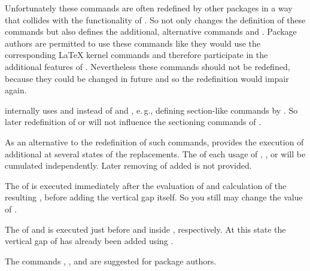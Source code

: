 Unfortunately these commands are often redefined by other packages in a way
that collides with the functionality of \KOMAScript. So \KOMAScript{} not only
changes the definition of these commands but also defines the additional,
alternative commands  and . Package
authors are permitted to use these commands like they would use the
corresponding \LaTeX{} kernel commands and therefore participate in the
additional features of \KOMAScript. Nevertheless these commands should not be
redefined, because they could be changed in future and so the redefinition would
impair \KOMAScript{} again.

\KOMAScript{} internally uses  and 
instead of  and , e.\,g., defining
section-like commands by . So
later redefinition of  or  will not
influence the sectioning commands of \KOMAScript.

As an alternative to the redefinition of such commands, \KOMAScript{} provides
the execution of additional  at several states of the
\KOMAScript{} replacements. The  of each usage of
, , or  will be
cumulated independently. Later removing of added  is not
provided.

The  of  is executed immediately after
the evaluation of  and calculation of the resulting
, before adding the vertical gap itself. So you still may
change the value of .

The  of  and 
 is executed just before 
and  inside , respectively. At this state
the vertical gap of  has already been added using
.

The commands , , and
 are suggested for package authors.%
%
\EndIndexGroup



